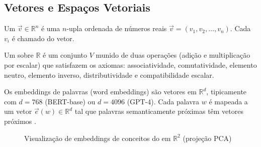 \subsection{Vetores e Espaços Vetoriais}
\begin{definicao}[Vetor]
Um  $\vec{v} \in \mathbb{R}^n$ é uma $n$-upla ordenada
de números reais $\vec{v} = (v_1, v_2, \ldots, v_n)$. Cada $v_i$ é
chamado  do vetor.
\end{definicao}
\begin{definicao}
Um  sobre $\mathbb{R}$ é um conjunto $V$
munido de duas operações (adição e multiplicação por escalar) que
satisfazem os axiomas: associatividade, comutatividade, elemento neutro,
elemento inverso, distributividade e compatibilidade escalar.
\end{definicao}
\begin{exemplo}
Os embeddings de palavras (word embeddings) são vetores em
$\mathbb{R}^d$, tipicamente com $d = 768$ (BERT-base) ou $d = 4096$
(GPT-4). Cada palavra $w$ é mapeada a um vetor $\vec{e}(w) \in
\mathbb{R}^d$ tal que palavras semanticamente próximas têm vetores
próximos \cite{devlin2019bert, vaswani2017attention}.
\end{exemplo}
\begin{figure}[htb]
\centering
\caption{Visualização de embeddings de conceitos do \opencodeeco{} em
$\mathbb{R}^2$ (projeção PCA)}
\label{fig:embeddings}
\end{figure}
